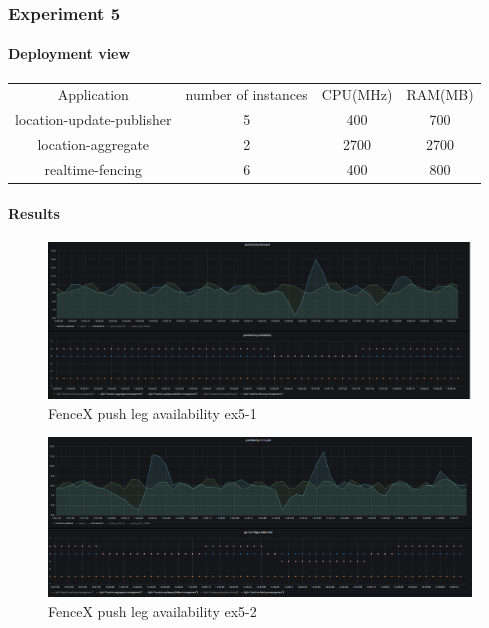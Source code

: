 \documentclass[a4]{report}
\begin{document}
        \clearpage

        \subsubsection{Experiment 5}

        \paragraph{Deployment view}
        \begin{center}
            \begin{tabular}{ c c c c }
                Application               & number of instances & CPU(MHz) & RAM(MB) \\
                location-update-publisher & 5                   & 400      & 700     \\
                location-aggregate        & 2                   & 2700     & 2700    \\
                realtime-fencing          & 6                   & 400      & 800     \\
            \end{tabular}
        \end{center}

        \paragraph{Results}
        \begin{figure}[ht]
            \caption{FenceX push leg availability ex5-1}
            \label{fig:ex5-1}
            \includegraphics[scale=0.4]{images/evaluation/ex5-benchmarking-ongoing-2per6sec.png}
        \end{figure}

        \begin{figure}[ht]
            \caption{FenceX push leg availability ex5-2}
            \label{fig:ex5-2}
            \includegraphics[scale=0.4]{images/evaluation/ex5-benchmarking-ongoing-2per7sec.png}
        \end{figure}
\end{document}
